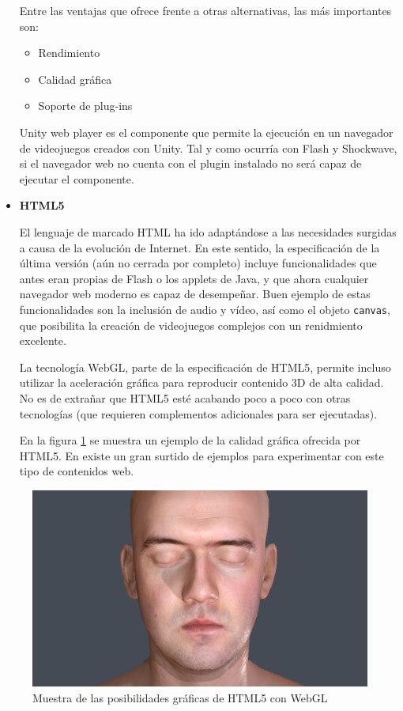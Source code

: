 \begin{itemize}
Entre las ventajas que ofrece frente a otras alternativas, las más importantes son:
\begin{itemize}
\item Rendimiento
\item Calidad gráfica
\item Soporte de plug-ins
\end{itemize}
Unity web player es el componente que permite la ejecución en un navegador de videojuegos creados con Unity. Tal y como ocurría con Flash y Shockwave, si el navegador web no cuenta con el plugin instalado no será capaz de ejecutar el componente.

\item{\bf HTML5}
  
El lenguaje de marcado \acs{HTML} ha ido adaptándose a las necesidades surgidas a causa de la evolución de Internet. En este sentido, la especificación de la última versión (aún no cerrada por completo) incluye funcionalidades que antes eran propias de Flash o los applets de Java, y que ahora cualquier navegador web moderno es capaz de desempeñar. Buen ejemplo de estas funcionalidades son la inclusión de audio y vídeo, así como el objeto {\tt canvas}, que posibilita la creación de videojuegos complejos con un renidmiento excelente.

La tecnología WebGL, parte de la especificación de HTML5, permite incluso utilizar la aceleración gráfica para reproducir contenido 3D de alta calidad. No es de extrañar que HTML5 esté acabando poco a poco con otras tecnologías (que requieren complementos adicionales para ser ejecutadas).

En la figura \ref{fig::webgl} se muestra un ejemplo de la calidad gráfica ofrecida por HTML5. En \cite{chrome-experiments} existe un gran surtido de ejemplos para experimentar con este tipo de contenidos web.

\end{itemize}

\begin{figure}[h]
  \begin{center}
    \includegraphics[width=\textwidth]{images/webgl.png}
    \caption{Muestra de las posibilidades gráficas de HTML5 con WebGL}
    \label{fig::webgl}
  \end{center}
\end{figure}

